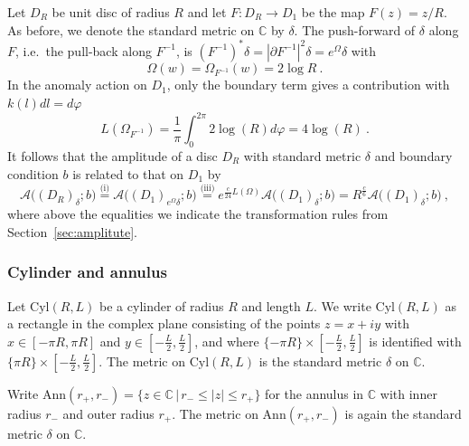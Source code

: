 \documentclass[11pt,a4paper]{article}
\numberwithin{equation}{section}
\begin{document}
Let $D_R$ be unit disc of radius $R$ and let $F: D_R \to D_1$ be the map $F(z)=z/R$.
As before, we denote the standard metric on $\mathbb{C}$ by $\delta$. The push-forward of $\delta$ along $F$, i.e.\ the pull-back along $F^{-1}$, is $(F^{-1})^* \delta = |\partial F^{-1}|^{2} \delta = e^{\Omega} \delta$ with
\begin{equation}
    \Omega(w) = \Omega_{F^{-1}}(w) =  2 \log R \ .
\end{equation}
In the anomaly action on $D_1$, only the boundary term gives a contribution with $k(l) dl = d\varphi$%
\begin{equation}
   L(\Omega_{F^{-1}}) = \frac{1}{\pi}\int_{0}^{2\pi} 2\log(R) d\varphi
    =4 \log(R) \ .
\end{equation}
It follows that the amplitude of a disc $D_R$ with standard metric $\delta$ and boundary condition $b$ is
related to that on $D_1$ by 
%
\begin{equation}
    \mathcal{A}\big((D_R)_\delta;b\big) 
    \overset{\text{(i)}}= 
    \mathcal{A}\big((D_1)_{e^{\Omega}\delta};b\big) 
    \overset{\text{(iii)}}=
    e^{\frac{c}{24}L(\Omega)}\mathcal{A}\big((D_1)_\delta;b\big) = R^{\frac{c}{6}} \mathcal{A}\big((D_1)_\delta;b\big)\ ,
\end{equation}
where above the equalities we indicate the transformation rules from Section~\ref{sec:amplitute}.


\subsubsection{Cylinder and annulus}\label{app:cyl-ann}

Let $\mathrm{Cyl}(R,L)$ be a cylinder of radius $R$ and length $L$. We write $\mathrm{Cyl}(R,L)$ as a rectangle in the complex plane consisting of the points $z = x+ i y$ with $x\in [-\pi R,\pi R]$ and $y\in[-\tfrac{L}{2},\tfrac{L}{2}]$, and where $\{-\pi R\} \times [-\tfrac{L}{2},\tfrac{L}{2}]$ is identified with $\{\pi R\} \times [-\tfrac{L}{2},\tfrac{L}{2}]$. The metric on $\mathrm{Cyl}(R,L)$ is the standard metric $\delta$ on $\mathbb{C}$.

Write $\mathrm{Ann}(r_+,r_-) = \{ z \in \mathbb{C} \,|\, r_- \le |z| \le r_+ \}$ for the annulus in $\mathbb{C}$ with inner radius $r_-$ and outer radius $r_+$.  The metric on $\mathrm{Ann}(r_+,r_-)$ is again the standard metric $\delta$ on $\mathbb{C}$.
\end{document}
